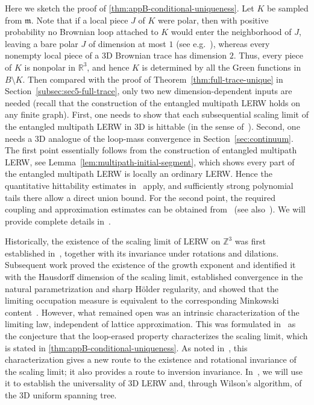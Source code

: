 \documentclass[11pt]{article}
\numberwithin{equation}{section}
\newcommand{\R}{\mathbb{R}}
\newcommand{\Z}{\mathbb{Z}}
\newcommand{\1}{\mathbf{1}}
\begin{document}
Here we sketch the proof of \eqref{thm:appB-conditional-uniqueness}. Let $K$ be sampled from $\mathfrak m$. Note that if a local piece $J$ of $K$ were polar, then with positive probability no Brownian loop attached to $K$ would enter the neighborhood of $J$, leaving a bare polar $J$ of dimension at most \(1\) (see e.g.~\cite[Theorem 5.9.6]{ArmitageGardiner2001}), whereas every nonempty local piece of a 3D Brownian trace has dimension \(2\).
Thus, every piece of $K$ is nonpolar in $\R^3$, and hence $K$ is determined by all the Green functions in $B\setminus K$. Then compared with the proof of Theorem~\ref{thm:full-trace-unique} in Section~\ref{subsec:sec5-full-trace},
only two new dimension-dependent inputs are needed (recall that the construction of the entangled multipath LERW holds on any finite graph).  First, one
needs to show that each subsequential scaling limit of the entangled multipath LERW in 3D is hittable (in the sense of~\cite[Theorem 3.1]{SS18}).  Second, one needs a 3D analogue of the loop-mass convergence in Section~\ref{sec:continuum}.  The first point essentially follows from the construction of entangled multipath LERW, see Lemma~\ref{lem:multipath-initial-segment}, which shows every part of the entangled multipath LERW is locally an ordinary LERW. Hence the quantitative hittability estimates in~\cite[Lemmas 3.2 and 3.3]{SS18} apply, and sufficiently strong polynomial tails there allow a direct union bound.  For the second point, the required coupling and
approximation estimates can be obtained from~\cite{SS18} (see also~\cite{Qian2026}). We will provide complete details in~\cite{CCLS26}.

Historically, the existence of the scaling limit of LERW on $\Z^3$ was first established in~\cite{kozma-lerw-3d}, together with its invariance under rotations and
dilations. Subsequent work proved the existence of
the growth exponent and identified it with the Hausdorff dimension of
the scaling limit, established convergence in the natural
parametrization and sharp H{\"o}lder regularity, and showed that the
limiting occupation measure is equivalent to the corresponding
Minkowski content~\cite{ShiGrowth,ShiDimension,LSNatural,LSHolder,HLSMinkowski}.
However, what remained open was an intrinsic characterization of the limiting
law, independent of lattice approximation. This was formulated in~\cite[Conjecture~1.3]{SS18} as the conjecture that the loop-erased property characterizes the scaling limit, which is stated in \eqref{thm:appB-conditional-uniqueness}. As noted in~\cite{SS18}, this characterization gives a new route
to the existence and rotational invariance of the scaling limit; it
also provides a route to inversion invariance. In~\cite{CCLS26}, we will
use it to establish the universality of 3D LERW and,
through Wilson's algorithm, of the 3D uniform spanning
tree.
\end{document}
